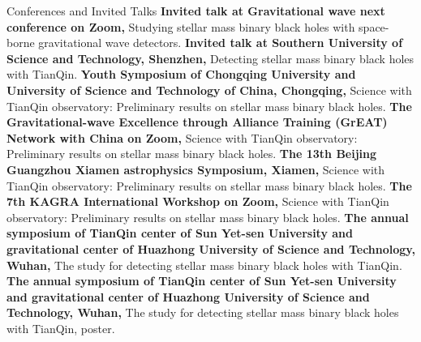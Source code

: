 
\begin{rubric}{Conferences and Invited Talks}
    \entry*[2022] \textbf{Invited talk at Gravitational wave next conference on Zoom,} Studying stellar mass
    binary black holes with space-borne gravitational wave detectors.
    \entry*[2022] \textbf{Invited talk at Southern University of Science and Technology, Shenzhen,} Detecting stellar mass
    binary black holes with TianQin. 
    \entry*[2021] \textbf{Youth Symposium of Chongqing University and University of Science and Technology of China,
    Chongqing,} Science with TianQin observatory: Preliminary results on stellar mass binary black holes.
    \entry*[2021] \textbf{The Gravitational-wave Excellence through Alliance Training (GrEAT) Network with China on
    Zoom,} Science with TianQin observatory: Preliminary results on stellar mass binary black holes.
    \entry*[2020] \textbf{The 13th Beijing Guangzhou Xiamen astrophysics Symposium, Xiamen,} Science with
    TianQin observatory: Preliminary results on stellar mass binary black holes.
    \entry*[2020] \textbf{The 7th KAGRA International Workshop on Zoom,} Science with
    TianQin observatory: Preliminary results on stellar mass binary black holes.
    \entry*[2019] \textbf{The annual symposium of TianQin center of Sun Yet-sen University and gravitational center of
    Huazhong University of Science and Technology,
    Wuhan,} The study for detecting stellar mass binary black holes with TianQin. 
    \entry*[2018] \textbf{The annual symposium of TianQin center of Sun Yet-sen University and gravitational center of
    Huazhong University of Science and Technology,
    Wuhan,} The study for detecting stellar mass binary black holes with TianQin, poster.
\end{rubric}
